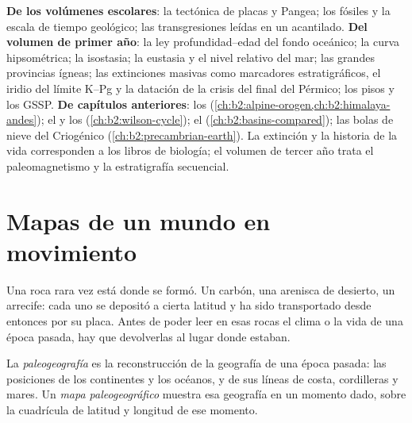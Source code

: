 \begin{recall}
\textbf{De los volúmenes escolares}: la tectónica de placas y Pangea; los fósiles y la escala de tiempo
geológico; las transgresiones leídas en un acantilado. \textbf{Del volumen de primer año}: la ley profundidad--edad del
fondo oceánico; la curva hipsométrica; la isostasia; la eustasia y el nivel relativo del mar; las grandes
provincias ígneas; las extinciones masivas como marcadores estratigráficos, el iridio del límite K--Pg y la
datación de la crisis del final del Pérmico; los pisos y los GSSP. \textbf{De capítulos anteriores}: los 
(\cref{ch:b2:alpine-orogen,ch:b2:himalaya-andes}); el  y los 
(\cref{ch:b2:wilson-cycle}); el  (\cref{ch:b2:basins-compared}); las bolas de nieve del
Criogénico (\cref{ch:b2:precambrian-earth}). La extinción y la historia de la vida corresponden a los
libros de biología; el volumen de tercer año trata el paleomagnetismo y la estratigrafía secuencial.
\end{recall}

\section{Mapas de un mundo en movimiento}\label{sec:b2:phanerozoic-earth:maps}

Una roca rara vez está donde se formó. Un carbón, una arenisca de desierto, un arrecife: cada uno se depositó a
cierta latitud y ha sido transportado desde entonces por su placa. Antes de poder leer en esas rocas el clima o la vida de
una época pasada, hay que devolverlas al lugar donde estaban.

\begin{definition}\label{def:b2:phanerozoic-earth:palaeogeography}
La \emph{paleogeografía} es la reconstrucción de la geografía de una época
pasada: las posiciones de los continentes y los océanos, y de sus líneas de costa, cordilleras y
mares. Un \emph{mapa paleogeográfico} muestra esa geografía en un
momento dado, sobre la cuadrícula de latitud y longitud de ese momento.
\end{definition}

